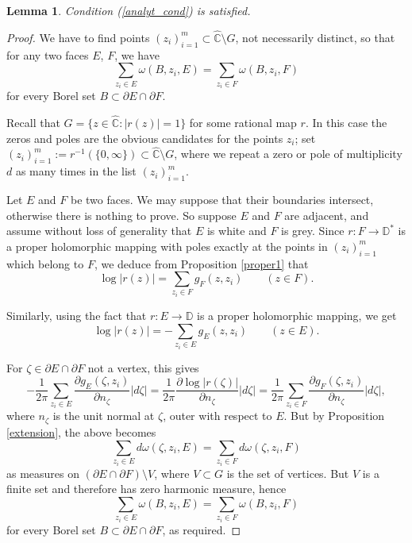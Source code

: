 \documentclass{amsart}
\theoremstyle{plain}
\newtheorem{lemma}[theorem]{Lemma}
\theoremstyle{definition}
\theoremstyle{remark}
\newcommand{\mD}{\mathbb{D}}
\newcommand{\hC}{\widehat{\mathbb{C}}}
\begin{document}
\begin{lemma}
\label{lemma:analyt}
Condition \emph{(\ref{analyt_cond})} is satisfied.
\end{lemma}

\begin{proof}
We have to find points $(z_i)_{i=1}^m \subset \hC \setminus G$, not necessarily distinct, so that for any two faces $E$, $F$, we have
$$
\sum_{z_i \in E} \omega(B, z_i, E) = \sum_{z_i \in F} \omega(B, z_i, F)
$$
for every Borel set $B\subset \partial E\cap \partial F$.

Recall that $G=\{z \in \hC: |r(z)|=1\}$ for some rational map $r$. In this case the zeros and poles are the obvious candidates for the points $z_i$; set $(z_i)_{i=1}^m:=r^{-1}(\{0,\infty\}) \subset \hC \setminus G$, where we repeat a zero or pole of multiplicity $d$ as many times in the list $(z_i)_{i=1}^m$.

Let $E$ and $F$ be two faces. We may suppose that their boundaries intersect, otherwise there is nothing to prove. So suppose $E$ and $F$ are adjacent, and assume without loss of generality that $E$ is white and $F$ is grey. Since $r:F \to \mD^*$ is a proper holomorphic mapping with poles exactly at the points in $(z_i)_{i=1}^m$ which belong to $F$, we deduce from Proposition \ref{proper1} that
$$
\log{|r(z)|} = \sum_{z_i \in F} g_F(z,z_i) \qquad (z \in F).
$$

Similarly, using the fact that $r:E \to \mD$ is a proper holomorphic mapping, we get
$$
\log{|r(z)|} = -\sum_{z_i \in E} g_E(z,z_i) \qquad (z \in E).
$$

For $\zeta \in \partial E \cap \partial F$ not a vertex, this gives
$$-\frac{1}{2\pi} \sum_{z_i \in E} \frac{\partial g_E (\zeta , z_i)}{\partial n_\zeta} |d\zeta|=\frac{1}{2\pi} \frac{\partial \log{|r(\zeta)|}}{\partial n_\zeta} |d\zeta| = \frac{1}{2\pi} \sum_{z_i \in F} \frac{\partial g_F (\zeta , z_i)}{\partial n_\zeta} |d\zeta|,$$
where $n_\zeta$ is the unit normal at $\zeta$, outer with respect to $E$. But by Proposition \ref{extension}, the above becomes
$$
\sum_{z_i \in E} d\omega(\zeta,z_i,E) = \sum_{z_i \in F} d\omega(\zeta,z_i,F)
$$
as measures on $(\partial E \cap \partial F) \setminus V$, where $V \subset G$ is the set of vertices. But $V$ is a finite set and therefore has zero harmonic measure, hence
$$
\sum_{z_i \in E} \omega(B, z_i, E) = \sum_{z_i \in F} \omega(B, z_i, F)
$$
for every Borel set $B \subset \partial E \cap \partial F$, as required.
\end{proof}
\end{document}
